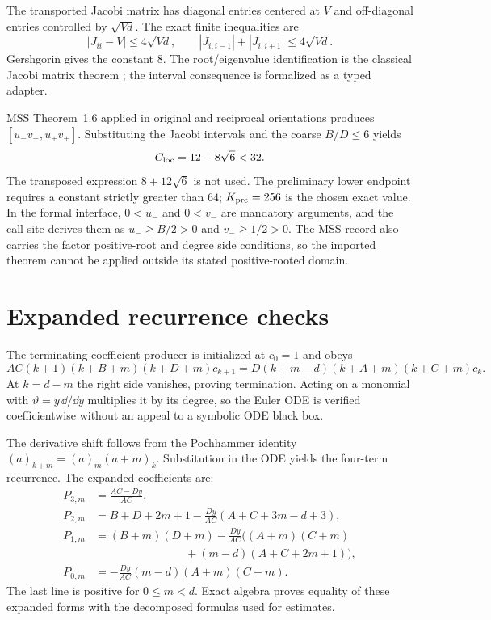 \documentclass[10pt]{article}
\begin{document}
The transported Jacobi matrix has diagonal entries centered at $V$ and
off-diagonal entries controlled by $\sqrt{Vd}$.  The exact finite inequalities
are
\[
 |J_{ii}-V|\le4\sqrt{Vd},\qquad
 |J_{i,i-1}|+|J_{i,i+1}|\le4\sqrt{Vd}.
\]
Gershgorin gives the constant $8$.  The root/eigenvalue identification is the
classical Jacobi matrix theorem \cite{Szego1975}; the interval consequence is
formalized as a typed adapter.

MSS Theorem~1.6 applied in original and reciprocal orientations produces
$[u_-v_-,u_+v_+]$.  Substituting the Jacobi intervals and the coarse
$B/D\le6$ yields
\[
 C_{\rm loc}=12+8\sqrt6<32.
\]
The transposed expression $8+12\sqrt6$ is not used.  The preliminary lower
endpoint requires a constant strictly greater than $64$; $K_{\rm pre}=256$
is the chosen exact value.  In the formal interface, $0<u_-$ and $0<v_-$ are
mandatory arguments, and the call site derives them as $u_-\ge B/2>0$ and
$v_-\ge1/2>0$.  The MSS record also carries the factor positive-root and
degree side conditions, so the imported theorem cannot be applied outside
its stated positive-rooted domain.

\section{Expanded recurrence checks}\label{sup:recurrence}

The terminating coefficient producer is initialized at $c_0=1$ and obeys
\[
 AC(k+1)(k+B+m)(k+D+m)c_{k+1}
 =D(k+m-d)(k+A+m)(k+C+m)c_k.
\]
At $k=d-m$ the right side vanishes, proving termination.  Acting on a
monomial with $\vartheta=y\,\dd/\dd y$ multiplies it by its degree, so the
Euler ODE is verified coefficientwise without an appeal to a symbolic ODE
black box.

The derivative shift follows from the Pochhammer identity
$(a)_{k+m}=(a)_m(a+m)_k$.  Substitution in the ODE yields the four-term
recurrence.  The expanded coefficients are:
\begin{align*}
 P_{3,m}&=\frac{AC-Dy}{AC},\\
 P_{2,m}&=B+D+2m+1
 -\frac{Dy}{AC}(A+C+3m-d+3),\\
 P_{1,m}&=(B+m)(D+m)
 -\frac{Dy}{AC}\bigl((A+m)(C+m)\\
 &\hspace{8em}+(m-d)(A+C+2m+1)\bigr),\\
 P_{0,m}&=-\frac{Dy}{AC}(m-d)(A+m)(C+m).
\end{align*}
The last line is positive for $0\le m<d$.  Exact algebra proves equality of
these expanded forms with the decomposed formulas used for estimates.
\end{document}
